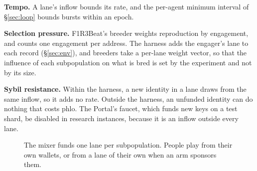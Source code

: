 \documentclass[11pt,a4paper]{article}
\begin{document}
\textbf{Tempo.} A lane's inflow bounds its rate, and the per-agent minimum interval of
\S\ref{sec:loop} bounds bursts within an epoch.

\textbf{Selection pressure.} F1R3Beat's breeder weights reproduction by engagement, and
 counts one engagement per address. The harness adds the engager's lane to
each record (\S\ref{sec:env}), and breeders \MUST{} take a per-lane weight vector, so that the
influence of each subpopulation on what is bred is set by the experiment and not by its size.

\textbf{Sybil resistance.} Within the harness, a new identity in a lane draws from the same
inflow, so it adds no rate. Outside the harness, an unfunded identity can do nothing that costs
phlo. The Portal's faucet, which funds new keys on a test shard, \MUST{} be disabled in research
instances, because it is an inflow outside every lane.

\begin{figure}[ht]
\centering
{}
\caption{The mixer funds one lane per subpopulation. People play from their own wallets, or from a
lane of their own when an arm sponsors them.}
\label{fig:lanes}
\end{figure}
\end{document}
